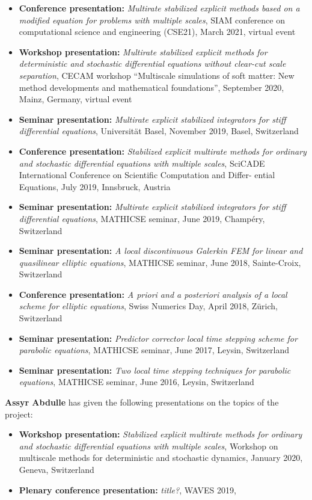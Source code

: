 \documentclass[10pt]{article}
\begin{document}
\begin{itemize}
	\item \textbf{Conference presentation:} \textit{Multirate stabilized explicit methods based on a modified equation for problems with multiple scales}, SIAM conference on computational science and engineering (CSE21), March 2021, virtual event
	\item \textbf{Workshop presentation:} \textit{Multirate stabilized explicit methods for deterministic and stochastic differential equations without clear-cut scale separation}, CECAM workshop ``Multiscale simulations of soft matter: New method developments and mathematical foundations'', September 2020, Mainz, Germany, virtual event 
	\item \textbf{Seminar presentation:} \textit{Multirate explicit stabilized integrators for stiff differential equations}, Universität Basel, November 2019, Basel, Switzerland
	\item \textbf{Conference presentation:} \textit{Stabilized explicit multirate methods for ordinary and stochastic differential equations with multiple scales}, SciCADE International Conference on Scientific Computation and Differ-
	ential Equations, July 2019, Innsbruck, Austria
	\item \textbf{Seminar presentation:} \textit{Multirate explicit stabilized integrators for stiff differential equations}, MATHICSE seminar, June 2019, Champéry, Switzerland
	\item \textbf{Seminar presentation:} \textit{A local discontinuous Galerkin FEM for linear and quasilinear elliptic equations}, MATHICSE seminar, June 2018, Sainte-Croix, Switzerland
	\item \textbf{Conference presentation:} \textit{A priori and a posteriori analysis of a local scheme for elliptic equations}, Swiss Numerics Day, April 2018, Zürich, Switzerland
	\item \textbf{Seminar presentation:} \textit{Predictor corrector local time stepping scheme for parabolic equations}, MATHICSE seminar, June 2017, Leysin, Switzerland
	\item \textbf{Seminar presentation:} \textit{Two local time stepping techniques for parabolic equations}, MATHICSE seminar, June 2016, Leysin, Switzerland
\end{itemize}
%
\textbf{Assyr Abdulle} has given the following presentations on the topics of the project:
\begin{itemize}
	\item \textbf{Workshop presentation:} \textit{Stabilized explicit multirate methods for ordinary and stochastic differential equations with multiple scales}, Workshop on multiscale methods for deterministic and stochastic dynamics, January 2020, Geneva, Switzerland
	\item \textbf{Plenary conference presentation:} \textit{title?}, WAVES 2019, 
\end{itemize}
\end{document}
